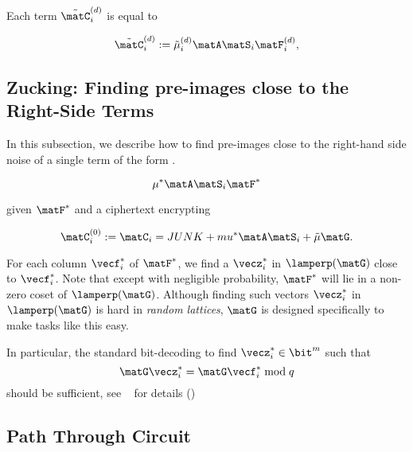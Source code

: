 Each term $\tilde{\matC}^{(d)}_{i}$ is
equal to 

\begin{equation*}\label{eq:term_eq}\tilde{\matC}^{(d)}_{i}:=\tilde{\mu}^{(d)}_{i}\matA\matS_{i}\matF^{(d)}_{i},\end{equation*}


\subsection{Zucking: Finding pre-images close to the Right-Side Terms}

In this subsection, we describe how to find pre-images close to the
right-hand side noise of a single term of the form . 

\begin{equation*}\label{eq:term_eq_2}
  \mu^{*}\matA\matS_{i}\matF^{*}\end{equation*}

given $\matF^{*}$ and a ciphertext encrypting 


\begin{equation*}\matC^{(0)}_{i}:=\matC_{i}=JUNK+mu^{*}\matA\matS_{i}+\tilde{\mu}\matG.\end{equation*}

For each column $\vecf^{*}_i$ of $\matF^{*}$, we find a $\vecz^{*}_{i}$ in $\lamperp(\matG)$  close to
$\vecf^{*}_{i}$. Note that except with negligible probability, $\matF^{*}$
will lie in a non-zero coset of $\lamperp(\matG)$. 
Although finding such vectors $\vecz^{*}_{i}$ in $\lamperp(\matG)$ is
hard in \emph{random lattices}, $\matG$ is designed specifically to
make tasks like this easy. 

In particular, the standard bit-decoding to find $\vecz^{*}_{i} \in
\bit^{m}$ such that 
\[\matG\vecz_{i}^{*}=\matG\vecf^{*}_i \bmod{q}\] should be
sufficient, see ~\cite{DBLP:conf/eurocrypt/MicciancioP12} for details
()






\subsection{Path Through Circuit}
\label{sec:path}

